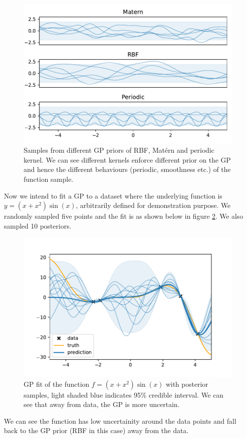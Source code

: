 \documentclass{statsmsc}
\begin{document}
\begin{figure}[H] 
  \includegraphics[width=0.8\linewidth]{../figures/prior.pdf}
  \centering
  \caption{Samples from different GP priors of RBF, Matérn and periodic kernel. We can see different kernels enforce different prior on the GP and hence the different behaviours (periodic, smoothness etc.) of the function sample.}
  \label{fig:prior}
\end{figure}

Now we intend to fit a GP to a dataset where the underlying function is $y=(x+x^2)\sin(x)$, arbitrarily defined for demonstration purpose.
We randomly sampled five points and the fit is as shown below in figure \ref{fig:posterior}.
We also sampled 10 posteriors.

\begin{figure}[H] 
  \includegraphics[width=0.8\linewidth]{../figures/posterior.pdf}
  \centering
  \caption{GP fit of the function $f=(x+x^2)\sin(x)$ with posterior samples, light shaded blue indicates 95\% credible interval. We can see that away from data, the GP is more uncertain.}
  \label{fig:posterior}
\end{figure}

We can see the function has low uncertainity around the data points and fall back to the GP prior (RBF in this case) away from the data.
\end{document}

